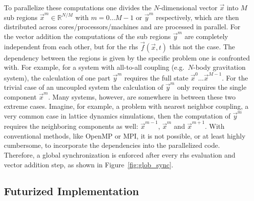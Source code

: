 \documentclass[10pt]{elsarticle}
\begin{document}
To parallelize these computations one divides the $N$-dimensional vector $\vec x$ into $M$ sub regions $\vec x^{m}\in \mathbb{R}^{N/M}$ with $m=0\dots M-1$ or $\vec y^{m}$ respectively, which are then distributed across cores/processors/machines and are processed in parallel.
For the vector addition the computations of the sub regions $\vec y^m$ are completely independent from each other, but for the rhs $\vec f(\vec x , t)$ this not the case.
The dependency between the regions is given by the specific problem one is confronted with.
For example, for a system with all-to-all coupling (e.g.\ $N$-body gravitation system), the calculation of one part $\vec y^m$ requires the full state $\vec x^{0}\dots \vec x^{M-1}$.
For the trivial case of an uncoupled system the calculation of $\vec y^m$ only requires the single component $\vec x^m$.
Many systems, however, are somewhere in between these two extreme cases.
Imagine, for example, a problem with nearest neighbor coupling, a very common case in lattice dynamics simulations, then the computation of $\vec y^m$ requires the neighboring components as well: $\vec x^{m-1}$, $\vec x^{m}$ and $\vec x^{m+1}$.
With conventional methods, like OpenMP or MPI, it is not possible, or at least highly cumbersome, to incorporate the dependencies into the parallelized code.
Therefore, a global synchronization is enforced after every rhs evaluation and vector addition step, as shown in Figure~\ref{fig:glob_sync}.

\subsection{Futurized Implementation}
\end{document}
